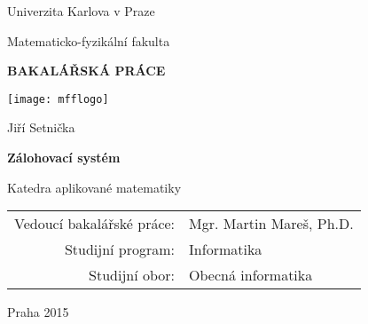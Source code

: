 \documentclass[12pt,a4paper]{report}
\begin{document}

\setcounter{page}{-5} %

\pagestyle{empty}
\begin{center}

\large

Univerzita Karlova v Praze

\medskip

Matematicko-fyzikální fakulta

\vfill

{\bf\Large BAKALÁŘSKÁ PRÁCE}

\vfill

\centerline{\mbox{\texttt{[image: mfflogo]}}}

\vfill
\vspace{5mm}

{\LARGE Jiří Setnička}

\vspace{15mm}

{\LARGE\bfseries Zálohovací systém}

\vfill

Katedra aplikované matematiky

\vfill

\begin{tabular}{rl}

Vedoucí bakalářské práce: & Mgr. Martin Mareš, Ph.D. \\
\noalign{\vspace{2mm}}
Studijní program: & Informatika \\
\noalign{\vspace{2mm}}
Studijní obor: & Obecná informatika \\
\end{tabular}

\vfill

Praha 2015

\end{center}

\newpage

\end{document}
